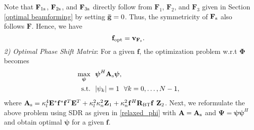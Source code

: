\documentclass[journal,draftclsnofoot,onecolumn,12pt]{IEEEtran}
\begin{document}
Note that $\mathbf{F}_{\rm 1s}$, $\mathbf{F}_{\rm 2s}$, and $\mathbf{F}_{\rm 3s}$ directly follow from $\mathbf{F}_1$, $\mathbf{F}_2$, and $\mathbf{F}_3$ given in Section \ref{optimal beamforming} by setting $\mathbf{\Bar{g}} = 0$. Thus, the symmetricity of $\mathbf{F}_{\rm s}$ also follows $\mathbf{F}$. Hence, we have
\vspace{-0.3cm}
\begin{equation}
    \mathbf{f}_{\rm opt} = \mathbf{v}_{\mathbf{F}_{\rm s}}.\label{OptSol_f_R2}
\end{equation}
\emph{2) Optimal Phase Shift Matrix}: For a given $\mathbf{f}$, the optimization problem w.r.t  $\mathbf{\Phi}$ becomes
\begin{subequations}
    \begin{align}
    \max_{\boldsymbol{\psi}}  ~~& \boldsymbol{\psi}^H \mathbf{A}_{\rm s} \boldsymbol{\psi}, \label{subprob_phi_R2}\\
   \text{s.t.} ~~& |\mathbf{\psi}_k| = 1 ~~ \forall k = 0,\ldots,N-1,
    \end{align}
\end{subequations}
where $\mathbf{A}_{\rm s}=\kappa_l^4 \mathbf{E}^*\mathbf{f}^* \mathbf{f}^T\mathbf{E}^T + \kappa_l^2 \kappa_n^2 \mathbf{Z}_1 + \kappa_n^2 \mathbf{f}^H\mathbf{R}_{\rm BT} \mathbf{f}~\mathbf{Z}_2$.  %
Next, we reformulate the above problem using SDR as given in \eqref{relaxed_phi} with $\mathbf{A}=\mathbf{A}_{\rm s}$ and $\mathbf{\Psi}=\boldsymbol{\psi\psi}^H$ and obtain optimal  $\boldsymbol{\psi}$ for a given $\mathbf{f}$.  
\end{document}

